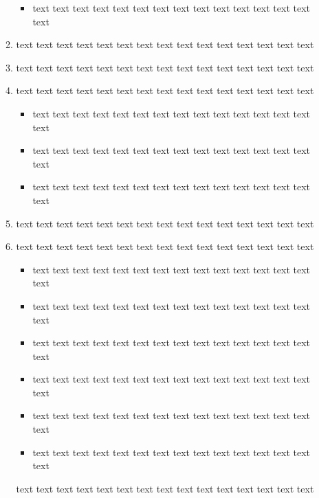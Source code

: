 \documentclass[12pt]{report}
\begin{document}
\begin{enumerate}
\begin{enumerate}
\begin{itemize}
\item text text text text text text text text text text text text text text text\\
\end{itemize}  
\item text text text text text text text text text text text text text text text\\
\item text text text text text text text text text text text text text text text\\
\item text text text text text text text text text text text text text text text\\
\begin{itemize}
\item text text text text text text text text text text text text text text text\\
\item text text text text text text text text text text text text text text text\\
\item text text text text text text text text text text text text text text text\\
\end{itemize}
\item text text text text text text text text text text text text text text text\\
\item text text text text text text text text text text text text text text text\\
\begin{itemize}
\item text text text text text text text text text text text text text text text\\
\item text text text text text text text text text text text text text text text\\
\item text text text text text text text text text text text text text text text\\
\item text text text text text text text text text text text text text text text\\
\item text text text text text text text text text text text text text text text\\
\item text text text text text text text text text text text text text text text\\
\end{itemize}
text text text text text text text text text text text text text text text\\


\end{enumerate}
\end{enumerate}
\end{document}
